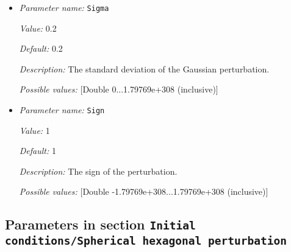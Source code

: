 \begin{itemize}
{\it Description:} The non-dimensional radial distance where the center of the perturbation is placed.


{\it Possible values:} [Double 0...1.79769e+308 (inclusive)]
\item {\it Parameter name:} {\tt Sigma}
\label{parameters:Initial conditions/Spherical gaussian perturbation/Sigma}


{\it Value:} 0.2


{\it Default:} 0.2


{\it Description:} The standard deviation of the Gaussian perturbation.


{\it Possible values:} [Double 0...1.79769e+308 (inclusive)]
\item {\it Parameter name:} {\tt Sign}
\label{parameters:Initial conditions/Spherical gaussian perturbation/Sign}


{\it Value:} 1


{\it Default:} 1


{\it Description:} The sign of the perturbation.


{\it Possible values:} [Double -1.79769e+308...1.79769e+308 (inclusive)]
\end{itemize}

\subsection{Parameters in section \tt Initial conditions/Spherical hexagonal perturbation}
\label{parameters:Initial_20conditions/Spherical_20hexagonal_20perturbation}

